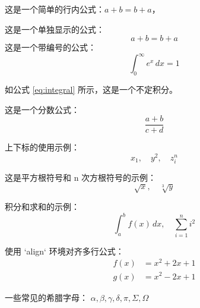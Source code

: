 \documentclass{article}
\begin{document}
这是一个简单的行内公式：$a+b=b+a$，

这是一个单独显示的公式：
\[
a+b=b+a
\]
这是一个带编号的公式：
\begin{equation}
\int_{0}^{\infty} e^{x} \, dx = 1
\label{eq:integral}
\end{equation}

如公式 \ref{eq:integral} 所示，这是一个不定积分。

这是一个分数公式： 
\[
\frac{a + b}{c + d}
\]

上下标的使用示例： 
\[
x_{1}, \quad y^{2}, \quad z_{i}^{n}
\]

这是平方根符号和 n 次方根符号的示例：
\[
\sqrt{x}, \quad \sqrt[3]{y}
\]

积分和求和的示例： 
\[
\int_{a}^{b} f(x) \, dx, \quad \sum_{i=1}^{n} i^2
\]

使用 `align` 环境对齐多行公式： 
\begin{align}
f(x) &= x^2 + 2x + 1 \\
g(x) &= x^2 - 2x + 1
\end{align}

一些常见的希腊字母： 
$\alpha, \beta, \gamma, \delta, \pi, \Sigma, \Omega$
\end{document}
